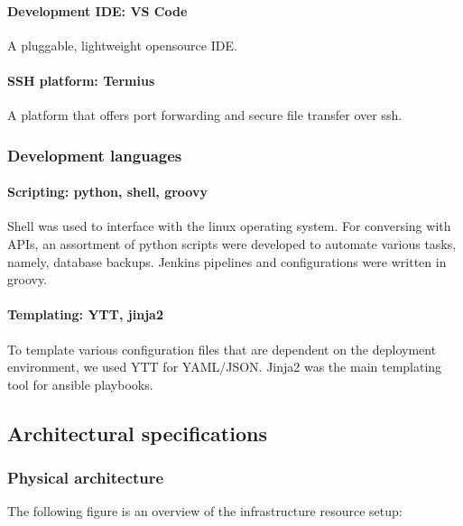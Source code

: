 \paragraph{Development IDE: VS Code }

A pluggable, lightweight opensource IDE. 

\paragraph{SSH platform: Termius }

A platform that offers port forwarding and secure file transfer over ssh. 

\subsubsection{Development languages }

\paragraph{Scripting: python\cite{Python}, shell, groovy\cite{Groovy} }

Shell was used to interface with the linux operating system. For conversing with APIs, an assortment of python scripts were developed to automate various tasks, namely, database backups. Jenkins pipelines and configurations were written in groovy. 

\paragraph{Templating: YTT\cite{YTT}, jinja2\cite{Jinja2} }

To template various configuration files that are dependent on the deployment environment, we used YTT for YAML/JSON. Jinja2 was the main templating tool for ansible playbooks. 

\subsection{Architectural specifications}

\subsubsection{Physical architecture}

The following figure is an overview of the infrastructure resource setup:

